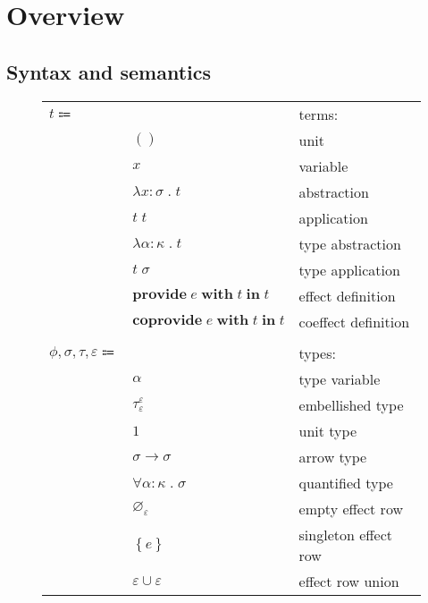 \documentclass[12pt]{article}
\newcommand\anno[2]{#1 : #2}
\newcommand\term{t}
\newcommand\eunit{()}
\newcommand\evar{x}
\newcommand\eabs[2]{\lambda #1 \; . \; #2}
\newcommand\eapp[2]{#1 \; #2}
\newcommand\etabs[2]{\lambda #1 \; . \; #2}
\newcommand\etapp[2]{#1 \; #2}
\newcommand\eprovide[3]{\textbf{provide} \; #1 \; \textbf{with} \; #2 \; \textbf{in} \; #3}
\newcommand\ecoprovide[3]{\textbf{coprovide} \; #1 \; \textbf{with} \; #2 \; \textbf{in} \; #3}
\newcommand\type{\phi}
\newcommand\proper{\tau}
\newcommand\row{\varepsilon}
\newcommand\embellished{\sigma}
\newcommand\tvar{\alpha}
\newcommand\tembellished[3]{{#1}^{#2}_{#3}}
\newcommand\tunit{1}
\newcommand\tarrow[2]{#1 \rightarrow #2}
\newcommand\tforall[2]{\forall #1 \; . \; #2}
\newcommand\tempty{\varnothing_{\row}}
\newcommand\tsingleton[1]{\left\{ #1 \right\}}
\newcommand\tunion[2]{#1 \cup #2}
\newcommand\kind{\kappa}
\newcommand\effect{e}
\begin{document}
  \section{Overview}

    \subsection{Syntax and semantics}

      \begin{figure}[H]
        \begin{mdframed}[backgroundcolor=none]
          \begin{center}
            \begin{tabular}{l l l}
              $\term \Coloneqq $ & & terms: \\
              & $\eunit$ & unit \\
              & $\evar$ & variable \\
              & $\eabs{\anno{\evar}{\embellished}}{\term}$ & abstraction \\
              & $\eapp{\term}{\term}$ & application \\
              & $\etabs{\anno{\tvar}{\kind}}{\term}$ & type abstraction \\
              & $\etapp{\term}{\embellished}$ & type application \\
              & $\eprovide{\effect}{\term}{\term}$ & effect definition \\
              & $\ecoprovide{\effect}{\term}{\term}$ & coeffect definition \\
              \\
              $\type,\embellished, \proper, \row \Coloneqq$ & & types: \\
              & $\tvar$ & type variable \\
              & $\tembellished{\proper}{\row}{\row}$ & embellished type \\
              & $\tunit$ & unit type \\
              & $\tarrow{\embellished}{\embellished}$ & arrow type \\
              & $\tforall{\anno{\tvar}{\kind}}{\embellished}$ & quantified type \\
              & $\tempty$ & empty effect row \\
              & $\tsingleton{\effect}$ & singleton effect row \\
              & $\tunion{\row}{\row}$ & effect row union \\

\end{tabular}
\end{center}
\end{mdframed}
\end{figure}
\end{document}
